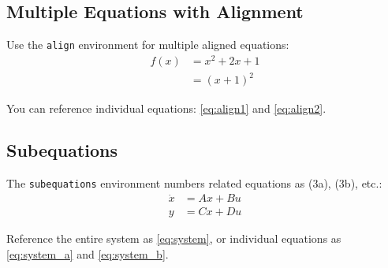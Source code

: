 \subsection{Multiple Equations with Alignment}

Use the \texttt{align} environment for multiple aligned equations:
\begin{align}
\label{eq:align1}
f(x) &= x^2 + 2x + 1 \\
\label{eq:align2}
&= (x+1)^2
\end{align}

You can reference individual equations: \eqref{eq:align1} and \eqref{eq:align2}.

\subsection{Subequations}

The \texttt{subequations} environment numbers related equations as (3a), (3b), etc.:
\begin{subequations}
\label{eq:system}
\begin{align}
\label{eq:system_a}
\dot{x} &= Ax + Bu \\
\label{eq:system_b}
y &= Cx + Du
\end{align}
\end{subequations}

Reference the entire system as \eqref{eq:system}, or individual equations as \eqref{eq:system_a} and \eqref{eq:system_b}.


